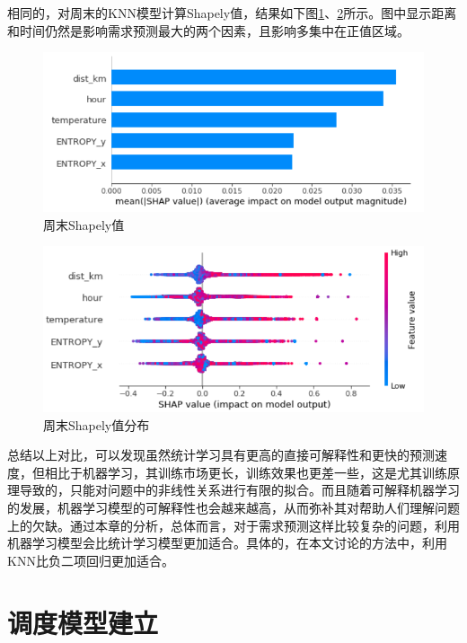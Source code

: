 \documentclass[]{tongjithesis}
\numberwithin{equation}{chapter}
\begin{document}
相同的，对周末的KNN模型计算Shapely值，结果如下图\ref{weekend_shap1}、\ref{weekend_shap2}所示。图中显示距离和时间仍然是影响需求预测最大的两个因素，且影响多集中在正值区域。
\begin{figure}[H]
	\centering
	\includegraphics[width= 0.9 \textwidth]{figures_main/shap_weekend.png}
	\caption{周末Shapely值}
	\label{weekend_shap1}
\end{figure}

\begin{figure}[H]
	\centering
	\includegraphics[width= 0.9 \textwidth]{figures_main/shap1_weekend.png}
	\caption{周末Shapely值分布}
	\label{weekend_shap2}
\end{figure}

总结以上对比，可以发现虽然统计学习具有更高的直接可解释性和更快的预测速度，但相比于机器学习，其训练市场更长，训练效果也更差一些，这是尤其训练原理导致的，只能对问题中的非线性关系进行有限的拟合。而且随着可解释机器学习的发展，机器学习模型的可解释性也会越来越高，从而弥补其对帮助人们理解问题上的欠缺。通过本章的分析，总体而言，对于需求预测这样比较复杂的问题，利用机器学习模型会比统计学习模型更加适合。具体的，在本文讨论的方法中，利用KNN比负二项回归更加适合。

\clearpage

\chapter{调度模型建立}
\end{document}
